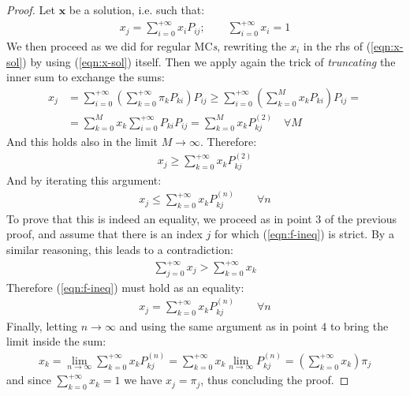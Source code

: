 \documentclass[../template.tex]{subfiles}
\begin{document}
\begin{proof}
    Let $\bm{x}$ be a solution, i.e. such that:
    \begin{align} \label{eqn:x-sol}
        x_j = \sum_{i=0}^{+\infty} x_i P_{ij}; \qquad \sum_{i=0}^{+\infty} x_i = 1
    \end{align} 
    We then proceed as we did for regular MC\textit{s}, rewriting the $x_i$ in the rhs of (\ref{eqn:x-sol}) by using (\ref{eqn:x-sol}) itself. Then we apply again the trick of \textit{truncating} the inner sum to exchange the sums: 
    \begin{align*}
        x_j &= \sum_{i=0}^{+\infty} \left(\sum_{k=0}^{+\infty} \pi_k P_{ki}\right) P_{ij} \geq \sum_{i=0}^{+\infty} \left(\sum_{k=0}^M x_k P_{ki}\right) P_{ij} =\\
        &= \sum_{k=0}^M x_k \sum_{i=0}^{+\infty} P_{ki} P_{ij} = \sum_{k=0}^M x_k P_{kj}^{(2)} \quad \forall M 
    \end{align*}
    And this holds also in the limit $M \to \infty$. Therefore:
    \begin{align*}
        x_j \geq \sum_{k=0}^{+\infty} x_k P_{kj}^{(2)}
    \end{align*}
    And by iterating this argument:
    \begin{align}\label{eqn:f-ineq}
        x_j \leq \sum_{k=0}^{+\infty} x_k P_{kj}^{(n)} \qquad \forall n
    \end{align}
    To prove that this is indeed an equality, we proceed as in point $3$ of the previous proof, and assume that there is an index $j$ for which (\ref{eqn:f-ineq}) is strict. By a similar reasoning, this leads to a contradiction:
    \begin{align*}
        \sum_{j=0}^{+\infty} x_j > \sum_{k=0}^{+\infty} x_k
    \end{align*}
    Therefore (\ref{eqn:f-ineq}) must hold as an equality:
    \begin{align*}
        x_j = \sum_{k=0}^{+\infty} x_k P_{kj}^{(n)} \qquad \forall n
    \end{align*}
    Finally, letting $n \to \infty$ and using the same argument as in point $4$ to bring the limit inside the sum:
    \begin{align*}
        x_k = \lim_{n \to \infty} \sum_{k=0}^{+\infty} x_k P_{kj}^{(n)} = \sum_{k=0}^{+\infty} x_k \lim_{n \to \infty} P_{kj}^{(n)} = \left(\sum_{k=0}^{+\infty} x_k \right) \pi_j
    \end{align*}
    and since $\sum_{k=0}^{+\infty} x_k = 1$ we have $x_j = \pi_j$, thus concluding the proof.
\end{proof}
\end{document}
